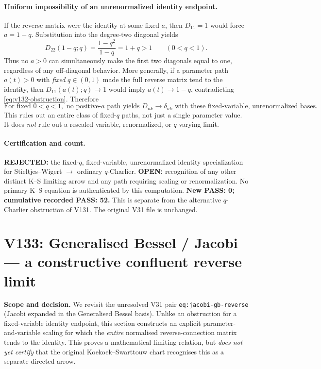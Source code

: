\documentclass[11pt]{article}
\begin{document}
\paragraph{Uniform impossibility of an unrenormalized identity endpoint.}
If the reverse matrix were the identity at some fixed $a$, then $D_{11}=1$ would force $a=1-q$.  Substitution into the degree-two diagonal yields
\begin{equation}\label{eq:v132-obstruction}
 D_{22}(1-q;q)=\frac{1-q^2}{1-q}=1+q>1
 \qquad(0<q<1).
\end{equation}
Thus no $a>0$ can simultaneously make the first two diagonals equal to one, regardless of any off-diagonal behavior.  More generally, if a parameter path $a(t)>0$ with \emph{fixed} $q\in(0,1)$ made the full reverse matrix tend to the identity, then $D_{11}(a(t);q)\to1$ would imply $a(t)\to1-q$, contradicting \eqref{eq:v132-obstruction}.  Therefore
\begin{equation}\label{eq:v132-no-path}
 \boxed{\text{For fixed }0<q<1,\text{ no positive-}a\text{ path yields }D_{nk}\to\delta_{nk}
 \text{ with these fixed-variable, unrenormalized bases.}}
\end{equation}
This rules out an entire class of fixed-$q$ paths, not just a single parameter value.  It does \emph{not} rule out a rescaled-variable, renormalized, or $q$-varying limit.

\paragraph{Certification and count.}
\textbf{REJECTED:} the fixed-$q$, fixed-variable, unrenormalized identity specialization for Stieltjes--Wigert $\to$ ordinary $q$-Charlier.  \textbf{OPEN:} recognition of any other distinct K--S limiting arrow and any path requiring scaling or renormalization.  No primary K--S equation is authenticated by this computation.  \textbf{New PASS: 0; cumulative recorded PASS: 52.}  This is separate from the alternative $q$-Charlier obstruction of V131.  The original V31 file is unchanged.


\clearpage
\section{V133: Generalised Bessel / Jacobi --- a constructive confluent reverse limit}
\noindent\textbf{Scope and decision.} We revisit the unresolved V31 pair
\texttt{eq:jacobi-gb-reverse} (Jacobi expanded in the Generalised Bessel basis).
Unlike an obstruction for a fixed-variable identity endpoint, this section
constructs an explicit parameter-and-variable scaling for which the \emph{entire}
normalised reverse-connection matrix tends to the identity. This proves a
mathematical limiting relation, but \emph{does not yet certify} that the
original Koekoek--Swarttouw chart recognises this as a separate directed arrow.
\end{document}
